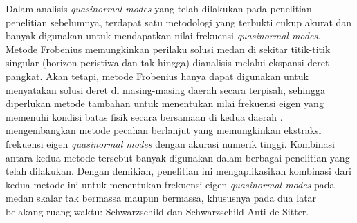 Dalam analisis \textit{quasinormal modes} yang telah dilakukan pada penelitian-penelitian sebelumnya, terdapat satu metodologi yang terbukti cukup akurat dan banyak digunakan untuk mendapatkan nilai frekuensi \textit{quasinormal modes}. Metode Frobenius memungkinkan perilaku solusi medan di sekitar titik-titik singular (horizon peristiwa dan tak hingga) dianalisis melalui ekspansi deret pangkat. Akan tetapi, metode Frobenius hanya dapat digunakan untuk menyatakan solusi deret di masing-masing daerah secara terpisah, sehingga diperlukan metode tambahan untuk menentukan nilai frekuensi eigen yang memenuhi kondisi batas fisik secara bersamaan di kedua daerah \parencite{Konoplya2011}. \textcite{Leaver1985} mengembangkan metode pecahan berlanjut yang memungkinkan ekstraksi frekuensi eigen \textit{quasinormal modes} dengan akurasi numerik tinggi. Kombinasi antara kedua metode tersebut banyak digunakan dalam berbagai penelitian yang telah dilakukan. Dengan demikian, penelitian ini mengaplikasikan kombinasi dari kedua metode ini untuk menentukan frekuensi eigen \textit{quasinormal modes} pada medan skalar tak bermassa maupun bermassa, khususnya pada dua latar belakang ruang-waktu: Schwarzschild dan Schwarzschild Anti-de Sitter.